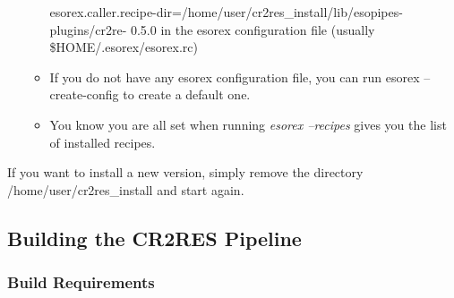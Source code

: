 \begin{itemize}
\begin{itemize}
                            esorex.caller.recipe-dir=/home/user/cr2res\_install/lib/esopipes-plugins/cr2re-
                            0.5.0
                            in the esorex configuration file (usually \$HOME/.esorex/esorex.rc)

                      \item If you do not have any esorex configuration file, you can run
                            esorex --create-config
                            to create a default one.

                      \item You know you are all set when running
                                    {\it esorex --recipes}
                            gives you the list of installed recipes.

              \end{itemize}
\end{itemize}

If you want to install a new version, simply remove the directory
/home/user/cr2res\_install and start again.

\subsection{Building the CR2RES Pipeline}
\label{sec:compile-howto}

\subsubsection{Build Requirements}
\label{sec:compile-requirements}

